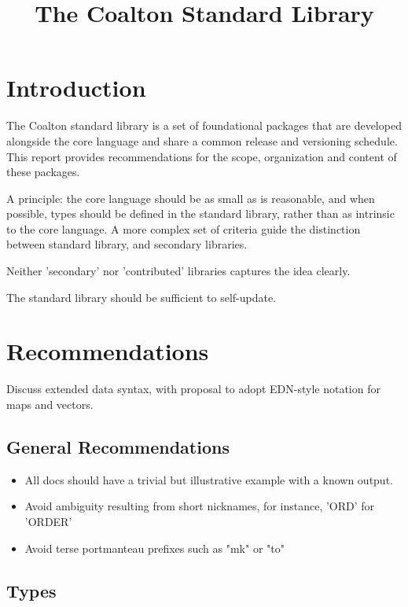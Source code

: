 \documentclass[12pt]{article}
\title{The Coalton Standard Library}
\begin{document}
\maketitle
\section{Introduction}
The Coalton standard library is a set of foundational packages that
are developed alongside the core language and share a common release
and versioning schedule. This report provides recommendations for the
scope, organization and content of these packages.

A principle: the core language should be as small as is reasonable,
and when possible, types should be defined in the standard library,
rather than as intrinsic to the core language. A more complex set of
criteria guide the distinction between standard library, and secondary
libraries.

 Neither 'secondary' nor 'contributed' libraries
captures the idea clearly.

The standard library should be sufficient to self-update.

\section{Recommendations}

Discuss extended data syntax, with proposal to adopt EDN-style
notation for maps and vectors.

\subsection{General Recommendations}

\begin{itemize}
\item All docs should have a trivial but illustrative example with a
  known output.
\item Avoid ambiguity resulting from short nicknames, for instance,
  'ORD' for 'ORDER'
\item Avoid terse portmanteau prefixes such as "mk" or "to"
\end{itemize}


\subsection{Types}
\end{document}
